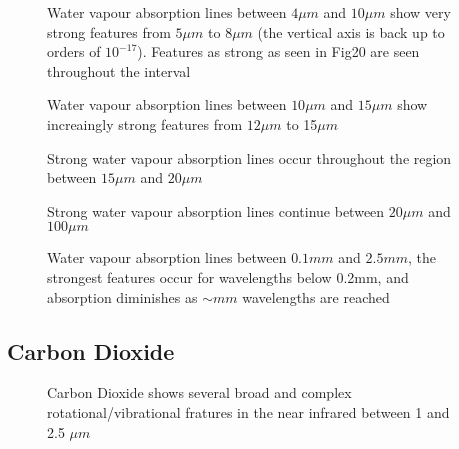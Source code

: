 \documentclass[12pt]{article}
\begin{document}
\vspace*{11.5cm}
\begin{figure}[htb]
\caption{Water vapour absorption lines between $4\mu m$ and $10\mu m$
   show very strong features from $5\mu m$ to 8$\mu m$ (the vertical axis
 is back up to orders of $10^{-17}$). Features as strong as seen in Fig20 are seen 
throughout the interval}    
\end{figure}
\newpage

\vspace*{11.5cm}
\begin{figure}[htb]
\caption{Water vapour absorption lines between $10\mu m$ and $15\mu m$
   show  increaingly strong features from $12\mu m$ to 15$\mu m$}
\end{figure}
\newpage


\vspace*{11.5cm}
\begin{figure}[htb]
\caption{Strong water vapour absorption lines occur throughout the region 
 between $15\mu m$ and $20\mu m$}
\end{figure}
\newpage

\vspace*{11.5cm}
\begin{figure}[htb]
\caption{Strong water vapour absorption lines continue between $20\mu m$ and $100\mu m$}
\end{figure}
\newpage

\vspace*{11.5cm}
\begin{figure}[htb]
\caption{Water vapour absorption lines between $0.1 mm$ and $2.5 mm$, the
strongest features occur for wavelengths below 0.2mm, and absorption diminishes
as $\sim mm$ wavelengths are reached}
\end{figure}
\newpage



\subsection{Carbon Dioxide}


\vspace*{11.5cm}
\begin{figure}[htb]
\caption{Carbon Dioxide shows several broad and complex rotational/vibrational
 fratures in the near infrared between 1 and 2.5 $\mu m$}
\end{figure}
\newpage
\end{document}
